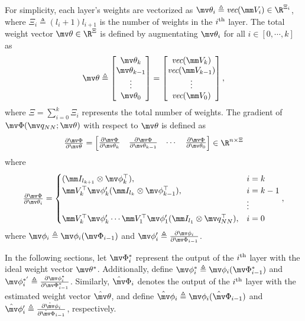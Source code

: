 \documentclass[lettersize,journal]{IEEEtran}
\newcommand*{\ptfrac}[2]{\tfrac{\partial #1}{\partial #2}}
\newcommand*{\q}{\mv q}
\newcommand*{\NN}{\mv\Phi}
\newcommand*{\act}{\mv\phi}
\newcommand*{\wth}{\mv\theta}
\newcommand*{\wV}{\mm V}
\begin{document}
For simplicity, each layer's weights are vectorized as $\wth_i\triangleq\textit{vec}(\wV_i)\in\R^{\Xi_i}$, where $\Xi_i\triangleq (l_i+1)l_{i+1}$ is the number of weights in the $i\textsuperscript{th}$ layer. 
The total weight vector $\wth\in\R^{\Xi}$ is defined by augmentating $\wth_i$ for all $i\in \left[0,\cdots,k\right]$ as 
\begin{equation}
    \wth \triangleq 
    \begin{bmatrix}
        \wth_k\\
        \wth_{k-1}\\
        \vdots\\
        \wth_0
    \end{bmatrix}
    =
    \begin{bmatrix}
        \textit{vec}(\wV_k)\\
        \textit{vec}(\wV_{k-1})\\
        \vdots\\
        \textit{vec}(\wV_0)
    \end{bmatrix},
\end{equation}
where $\Xi={\sum_{i=0}^{k} \Xi_i}$ represents the total number of weights. The gradient of $ \NN(\q_{NN};\wth)$ with respect to $\wth$ is defined as
\begin{equation}
    \ptfrac{\NN}{\wth}=
    \begin{bmatrix}
        \ptfrac{\NN}{\wth_k}&
        \ptfrac{\NN}{\wth_{k-1}}&
    \cdots &
        \ptfrac{\NN}{\wth_0}
    \end{bmatrix}
    \in\R^{n \times \Xi}
    \label{eq. nabla phi}
\end{equation}
where
\begin{equation}
    \ptfrac{\NN}{\wth_i} = 
    \begin{cases}
        (\mm I_{l_{k+1}}\otimes \act_{k}^\top  ), 
        &
        i=k 
        \\
        \wV_k^\top   \act_{k}' (\mm I_{l_{k}}\otimes  \act_{k-1}^\top  ), 
        & 
        i=k-1
        \\
        &
        \vdots 
        \\
        \wV_k^\top   \act'_{k} \cdots \wV_1^\top  \act_1' (\mm I_{l_1}\otimes \q_{NN}^\top  ), 
        &
        i = 0
    \end{cases},
\end{equation}
where $\act_i\triangleq \act_i(\NN_{i-1})$ and $\act_i'\triangleq \ptfrac{\act_i}{\NN_{i-1}}$.

In the following sections, let $\NN^*_i$ represent the output of the $i\textsuperscript{th}$ layer with the ideal weight vector $\wth^*$. 
Additionally, define $\act^*_i\triangleq\act_i(\NN^*_{i-1})$ and $\act^{*'}_i\triangleq \ptfrac{\act^*_i}{\NN^*_{i-1}}$. 
Similarly, $\hat\NN_i$ denotes the output of the $i\textsuperscript{th}$ layer with the estimated weight vector $\hat \wth$, and define $\hat\act_i\triangleq\act_i(\hat\NN_{i-1})$ and $\hat\act_i'\triangleq \ptfrac{\hat\act_i}{\hat\NN_{i-1}}$, respectively.
\end{document}
